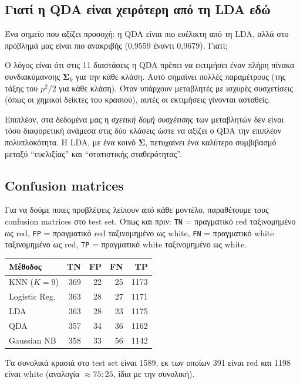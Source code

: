 \documentclass[11pt,a4paper]{article}
\newcommand{\code}[1]{\texttt{#1}}
\begin{document}
\subsection{Γιατί η QDA είναι χειρότερη από τη LDA εδώ}

Ένα σημείο που αξίζει προσοχή: η QDA είναι πιο ευέλικτη από τη LDA, αλλά
στο πρόβλημά μας είναι πιο ανακριβής (0,9559 έναντι 0,9679). Γιατί;

Ο λόγος είναι ότι στις 11 διαστάσεις η QDA πρέπει να εκτιμήσει έναν
πλήρη πίνακα συνδιακύμανσης \(\boldsymbol{\Sigma}_k\) για την κάθε
κλάση. Αυτό σημαίνει πολλές παραμέτρους (της τάξης του \(p^2/2\) για
κάθε κλάση). Όταν υπάρχουν μεταβλητές με ισχυρές συσχετίσεις (όπως οι
χημικοί δείκτες του κρασιού), αυτές οι εκτιμήσεις γίνονται ασταθείς.

Επιπλέον, στα δεδομένα μας η \emph{σχετική δομή συσχέτισης} των
μεταβλητών δεν είναι τόσο διαφορετική ανάμεσα στις δύο κλάσεις ώστε να
αξίζει ο QDA την επιπλέον πολυπλοκότητα. Η LDA, με ένα κοινό
\(\boldsymbol{\Sigma}\), πετυχαίνει ένα καλύτερο συμβιβασμό μεταξύ
``ευελιξίας'' και ``στατιστικής σταθερότητας''.

\subsection{Confusion matrices}

Για να δούμε ποιες προβλέψεις λείπουν από κάθε μοντέλο, παραθέτουμε τους
confusion matrices στο test set. Όπως και πριν:
\code{TN} = πραγματικό red ταξινομημένο ως red,
\code{FP} = πραγματικό red ταξινομημένο ως white,
\code{FN} = πραγματικό white ταξινομημένο ως red,
\code{TP} = πραγματικό white ταξινομημένο ως white.

\begin{center}
{\small
\begin{tabular}{lrrrr}
\toprule
Μέθοδος & TN & FP & FN & TP \\
\midrule
KNN (\(K=9\)) & 369 & 22 & 25 & 1173 \\
Logistic Reg. & 363 & 28 & 27 & 1171 \\
LDA & 363 & 28 & 23 & 1175 \\
QDA & 357 & 34 & 36 & 1162 \\
Gaussian NB & 358 & 33 & 56 & 1142 \\
\bottomrule
\end{tabular}
}
\end{center}

Τα συνολικά κρασιά στο test set είναι 1589, εκ των οποίων 391 είναι red
και 1198 είναι white (αναλογία \(\approx 75{:}25\), ίδια με την
συνολική).
\end{document}
